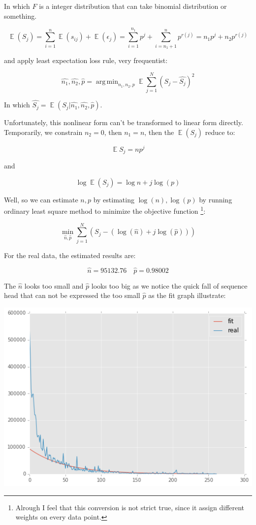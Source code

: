 \documentclass{article}
\DeclareMathOperator*{\argmin}{arg\,min}
\DeclareMathOperator{\E}{\mathbb{E}}
\begin{document}
In which $F$ is a integer distribution that can take binomial distribution or something.

\[
\E(S_j) = \sum_{i=1}^n \E(s_{ij}) + \E(\epsilon_j) = \sum_{i=1}^{n_1} p^j + \sum_{i=n_1+1}^n p^{r(j)}
= n_1 p^j + n_2 p^{r(j)}
\]

and apply least expectation loss rule, very frequentist:

\[
\hat{n_1},\hat{n_2},\hat{p} = \argmin_{n_1,n_2,p} \E\sum_{j=1}^N (S_j - \hat{S_j})^2
\]

In which $\hat{S_j} = \E(S_j | \hat{n_1},\hat{n_2},\hat{p})$.

Unfortunately, this nonlinear form can't be transformed to linear form directly. Temporarily, 
we constrain $n_2 = 0$, then $n_1 = n$, then the $\E(S_j)$ reduce to:

\[
\E{S_j} = n p^j
\]

and

\[
\log \E(S_j) = \log n + j \log(p)
\]

Well, so we can estimate $n,p$ by estimating $\log(n),\log(p)$ by running ordinary least square method to 
minimize the objective function \footnote{Alrough I feel that this conversion is not strict true, since
it assign different weights on every data point.}: 

\[
\min_{\hat{n},\hat{p}} \sum_{j=1}^N ( S_j - (\log(\hat{n}) + j \log(\hat{p})) )
\]

For the real data, the estimated results are:

\[
\hat{n} = 95132.76 \quad \hat{p} = 0.98002
\]

The $\hat{n}$ looks too small and $\hat{p}$ looks too big as we notice the quick fall of sequence head that
can not be expressed the too small $\hat{p}$ as the fit graph illustrate:

\includegraphics[scale=0.55]{simple-fit.png}
\end{document}
